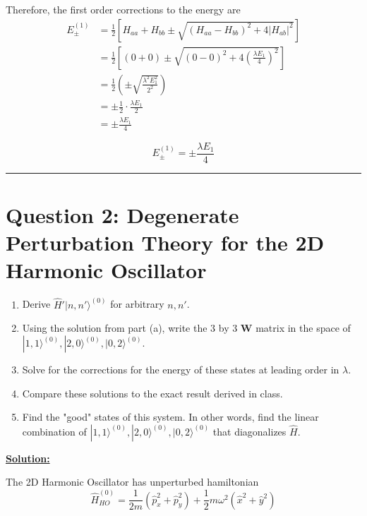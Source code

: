 \documentclass{article}
\newcommand{\ket}[1]{|#1 \rangle}
\begin{document}
Therefore, the first order corrections to the energy are 
\begin{align*}
  E_{\pm}^{(1)} &= \frac{1}{2} \left[ H_{aa} + H_{bb} \pm \sqrt{(H_{aa} - H_{bb})^2 + 4 \left| H_{ab} \right|^2 } \right] \\
  &= \frac{1}{2} \left[ (0 + 0) \pm \sqrt{(0 - 0)^2 + 4\left( \frac{\lambda E_1}{4} \right)^2} \right] \\
  &= \frac{1}{2} \left(\pm \sqrt{\frac{\lambda^2 E_1^2}{2^2}}\right) \\
  &= \pm \frac{1}{2} \cdot \frac{\lambda E_1}{2} \\
  &= \pm \frac{\lambda E_1}{4}
\end{align*}

\[ \boxed{ E_{\pm}^{(1)} = \pm \frac{\lambda E_1}{4} } \]

\vskip 0.5cm 
\hrule 
\vskip 0.5cm
\pagebreak


\section*{Question 2: Degenerate Perturbation Theory for the 2D Harmonic Oscillator} 


\begin{enumerate}[label=(\alph*)]
  \item Derive $\hat{H}'\ket{n, n'}^{(0)}$ for arbitrary $n, n'$.
  \item Using the solution from part (a), write the 3 by 3 $\mathbf{W}$ matrix in the space of $\ket{1, 1}^{(0)}, \ket{2, 0}^{(0)}, \ket{0, 2}^{(0)}$.
  \item Solve for the corrections for the energy of these states at leading order in $\lambda$.
  \item Compare these solutions to the exact result derived in class.
  \item Find the "good" states of this system. In other words, find the linear combination of $\ket{1, 1}^{(0)}, \ket{2, 0}^{(0)}, \ket{0, 2}^{(0)}$ that diagonalizes $\hat{H}$.
\end{enumerate}

\vskip 0.5cm
\underline{\textbf{Solution:}} 

\vskip 0.5cm
The 2D Harmonic Oscillator has unperturbed hamiltonian 
\[ \hat{H}_{HO}^{(0)} = \frac{1}{2m} \left( \hat{p}_x^2 + \hat{p}_y^2 \right)  + \frac{1}{2} m\omega^2 \left( \hat{x}^2 + \hat{y}^2 \right)\]
\end{document}
